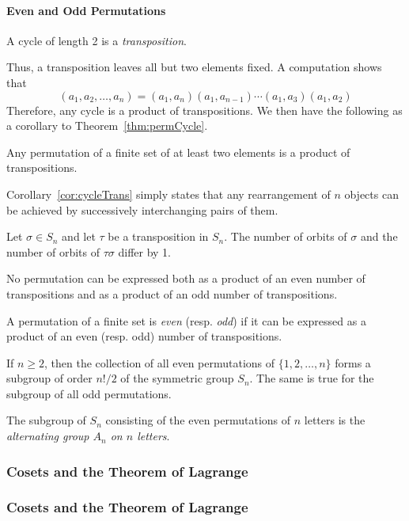\paragraph{Even and Odd Permutations}
\begin{definition}[Transposition]
A cycle of length 2 is a \emph{transposition}.
\end{definition}
Thus, a transposition leaves all but two elements fixed.
A computation shows that
\[
(a_1,a_2,\ldots,a_n) = (a_1,a_n)(a_1,a_{n-1})\cdots(a_1,a_3)(a_1,a_2)
\]
Therefore, any cycle is a product of transpositions.  We then have the
following as a corollary to Theorem~\ref{thm:permCycle}.
\begin{corollary}\label{cor:cycleTrans}
Any permutation of a finite set of at least two elements is a product
of transpositions.
\end{corollary} Corollary~\ref{cor:cycleTrans} simply states that any
rearrangement of $n$ objects can be achieved by successively
interchanging pairs of them.
\begin{lemma} Let $\sigma \in S_n$ and let $\tau$ be a transposition
in $S_n$.  The number of orbits of $\sigma$ and the number of orbits
of $\tau\sigma$ differ by 1.
\end{lemma}
\begin{theorem}
No permutation can be expressed both as a product of an even number of
transpositions and as a product of an odd number of transpositions.
\end{theorem} 

\begin{definition}
A permutation of a finite set is \emph{even} (resp. \emph{odd}) if it
can be expressed as a product of an even (resp. odd) number of
transpositions.
\end{definition}
\begin{proposition} If $n\geq 2$, then the collection of all even
permutations of $\{1,2,\ldots,n\}$ forms a subgroup of order $n!/2$ of
the symmetric group $S_n$.  The same is true for the subgroup of all
odd permutations. 
\end{proposition}

\begin{definition}
The subgroup of $S_n$ consisting of the even permutations of $n$
letters is the \emph{alternating group $A_n$ on $n$ letters}.
\end{definition}

{\subsubsection{Cosets and the Theorem of Lagrange}}
{\subsubsection{Cosets and the Theorem of Lagrange\protect\footnotemark}
}
